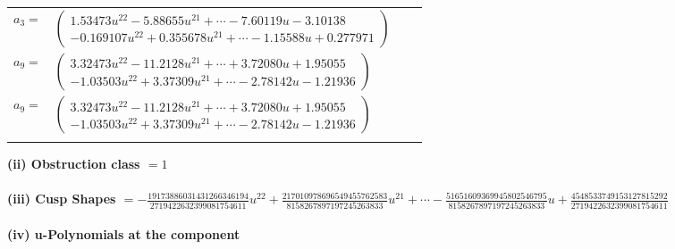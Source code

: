 \documentclass[1p]{elsarticle_modified}
\theoremstyle{definition}
\begin{document}
\begin{tabular}{m{7pt} m{180pt} m{7pt} m{180pt} }
\flushright $a_{3}=$&$\begin{pmatrix}1.53473 u^{22}-5.88655 u^{21}+\cdots-7.60119 u-3.10138\\-0.169107 u^{22}+0.355678 u^{21}+\cdots-1.15588 u+0.277971\end{pmatrix}$ \\
\flushright $a_{9}=$&$\begin{pmatrix}3.32473 u^{22}-11.2128 u^{21}+\cdots+3.72080 u+1.95055\\-1.03503 u^{22}+3.37309 u^{21}+\cdots-2.78142 u-1.21936\end{pmatrix}$\\ \flushright $a_{9}=$&$\begin{pmatrix}3.32473 u^{22}-11.2128 u^{21}+\cdots+3.72080 u+1.95055\\-1.03503 u^{22}+3.37309 u^{21}+\cdots-2.78142 u-1.21936\end{pmatrix}$\\&\end{tabular}
\flushleft \textbf{(ii) Obstruction class $= 1$}\\~\\
\flushleft \textbf{(iii) Cusp Shapes $= -\frac{19173886031431266346194}{2719422632399081754611} u^{22}+\frac{217010978696549455762583}{8158267897197245263833} u^{21}+\cdots-\frac{51651609369945802546795}{8158267897197245263833} u+\frac{4548533749153127815292}{2719422632399081754611}$}\\~\\
\newpage\renewcommand{\arraystretch}{1}
\flushleft \textbf{(iv) u-Polynomials at the component}\newline \\
\end{document}
